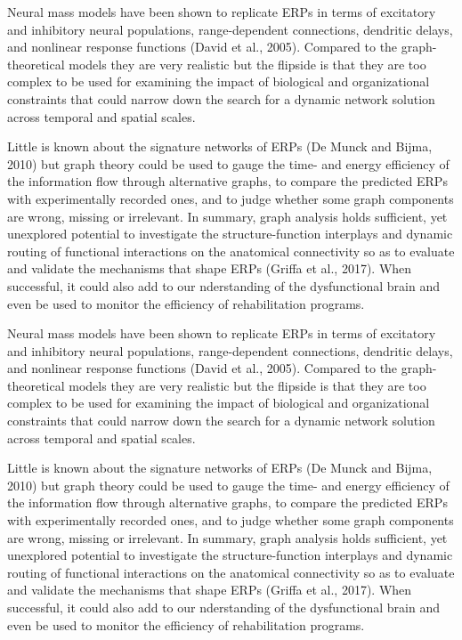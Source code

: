 Neural mass models have been shown to replicate ERPs in terms of excitatory and inhibitory neural populations, range-dependent connections, dendritic delays, and nonlinear response functions (David et al., 2005). Compared to the graph-theoretical models they are very realistic but the flipside is that they are too complex to be used for examining the impact of biological and organizational constraints that could narrow down the search for a dynamic network solution across temporal and spatial scales.

Little is known about the signature networks of ERPs (De Munck and Bijma, 2010) but graph theory could be used to gauge the time- and energy efficiency of the information flow through alternative graphs, to compare the predicted ERPs with experimentally recorded ones, and to judge whether some graph components are wrong, missing or irrelevant. In summary, graph analysis holds sufficient, yet unexplored potential to investigate the structure-function interplays and dynamic routing of functional interactions on the anatomical connectivity so as to evaluate and validate the mechanisms that shape ERPs (Griffa et al., 2017). When successful, it could also add to our nderstanding of the dysfunctional brain and even be used to monitor the efficiency of rehabilitation programs.

Neural mass models have been shown to replicate ERPs in terms of excitatory and inhibitory neural populations, range-dependent connections, dendritic delays, and nonlinear response functions (David et al., 2005). Compared to the graph-theoretical models they are very realistic but the flipside is that they are too complex to be used for examining the impact of biological and organizational constraints that could narrow down the search for a dynamic network solution across temporal and spatial scales.

Little is known about the signature networks of ERPs (De Munck and Bijma, 2010) but graph theory could be used to gauge the time- and energy efficiency of the information flow through alternative graphs, to compare the predicted ERPs with experimentally recorded ones, and to judge whether some graph components are wrong, missing or irrelevant. In summary, graph analysis holds sufficient, yet unexplored potential to investigate the structure-function interplays and dynamic routing of functional interactions on the anatomical connectivity so as to evaluate and validate the mechanisms that shape ERPs (Griffa et al., 2017). When successful, it could also add to our nderstanding of the dysfunctional brain and even be used to monitor the efficiency of rehabilitation programs.

